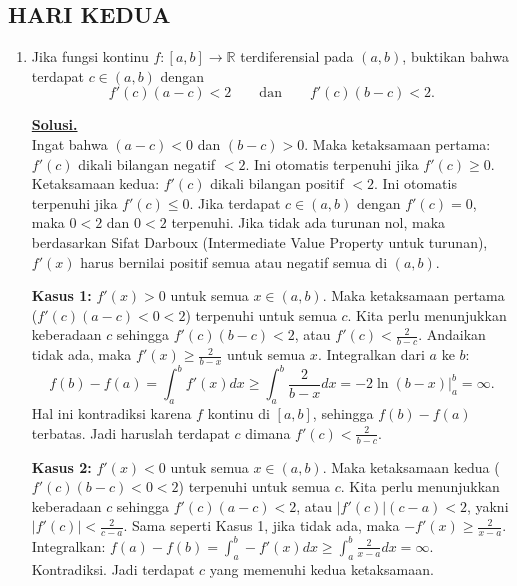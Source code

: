 \documentclass[12pt,twoside]{article}
\newenvironment{solution}
{
	\par\noindent\textbf{\underline{Solusi.}}\\
}
{
	\par
}
\begin{document}
\subsection{HARI KEDUA}
\begin{enumerate}
  \item Jika fungsi kontinu $f : [a,b] \to \mathbb{R}$ terdiferensial pada $(a,b)$, buktikan bahwa terdapat $c \in (a,b)$ dengan
        \[
          f'(c)(a-c) < 2 \qquad \text{dan} \qquad f'(c)(b-c) < 2.
        \]
        \begin{solution}
          Ingat bahwa $(a-c) < 0$ dan $(b-c) > 0$.
          Maka ketaksamaan pertama: $f'(c)$ dikali bilangan negatif $< 2$. Ini otomatis terpenuhi jika $f'(c) \ge 0$.
          Ketaksamaan kedua: $f'(c)$ dikali bilangan positif $< 2$. Ini otomatis terpenuhi jika $f'(c) \le 0$.
          Jika terdapat $c \in (a,b)$ dengan $f'(c)=0$, maka $0 < 2$ dan $0 < 2$ terpenuhi.
          Jika tidak ada turunan nol, maka berdasarkan Sifat Darboux (Intermediate Value Property untuk turunan), $f'(x)$ harus bernilai positif semua atau negatif semua di $(a,b)$.

          \textbf{Kasus 1:} $f'(x) > 0$ untuk semua $x \in (a,b)$.
          Maka ketaksamaan pertama ($f'(c)(a-c) < 0 < 2$) terpenuhi untuk semua $c$.
          Kita perlu menunjukkan keberadaan $c$ sehingga $f'(c)(b-c) < 2$, atau $f'(c) < \frac{2}{b-c}$.
          Andaikan tidak ada, maka $f'(x) \ge \frac{2}{b-x}$ untuk semua $x$.
          Integralkan dari $a$ ke $b$:
          \[ f(b)-f(a) = \int_a^b f'(x) dx \ge \int_a^b \frac{2}{b-x} dx = -2 \ln(b-x) \Big|_a^b = \infty. \]
          Hal ini kontradiksi karena $f$ kontinu di $[a,b]$, sehingga $f(b)-f(a)$ terbatas.
          Jadi haruslah terdapat $c$ dimana $f'(c) < \frac{2}{b-c}$.

          \textbf{Kasus 2:} $f'(x) < 0$ untuk semua $x \in (a,b)$.
          Maka ketaksamaan kedua ($f'(c)(b-c) < 0 < 2$) terpenuhi untuk semua $c$.
          Kita perlu menunjukkan keberadaan $c$ sehingga $f'(c)(a-c) < 2$, atau $|f'(c)|(c-a) < 2$, yakni $|f'(c)| < \frac{2}{c-a}$.
          Sama seperti Kasus 1, jika tidak ada, maka $-f'(x) \ge \frac{2}{x-a}$.
          Integralkan: $f(a)-f(b) = \int_a^b -f'(x) dx \ge \int_a^b \frac{2}{x-a} dx = \infty$.
          Kontradiksi.
          Jadi terdapat $c$ yang memenuhi kedua ketaksamaan.
        \end{solution}


\end{enumerate}
\end{document}
